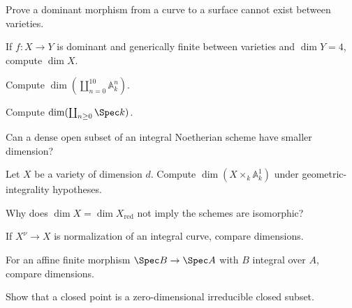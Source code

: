 \begin{exercise}[VI.30.E12]\label{exer:vi30-12}
Prove a dominant morphism from a curve to a surface cannot exist between varieties.
\end{exercise}

\begin{exercise}[VI.30.E13]\label{exer:vi30-13}
If $f:X\to Y$ is dominant and generically finite between varieties and $\dim Y=4$, compute $\dim X$.
\end{exercise}

\begin{exercise}[VI.30.E14]\label{exer:vi30-14}
Compute $\dim(\coprod_{n=0}^{10}\mathbb A^n_k)$.
\end{exercise}

\begin{exercise}[VI.30.E15]\label{exer:vi30-15}
Compute $\dim(\coprod_{n\ge0}\Spec k)$.
\end{exercise}

\begin{exercise}[VI.30.E16]\label{exer:vi30-16}
Can a dense open subset of an integral Noetherian scheme have smaller dimension?
\end{exercise}

\begin{exercise}[VI.30.E17]\label{exer:vi30-17}
Let $X$ be a variety of dimension $d$. Compute $\dim(X\times_k\mathbb A^1_k)$ under geometric-integrality hypotheses.
\end{exercise}

\begin{exercise}[VI.30.E18]\label{exer:vi30-18}
Why does $\dim X=\dim X_{\mathrm{red}}$ not imply the schemes are isomorphic?
\end{exercise}

\begin{exercise}[VI.30.E19]\label{exer:vi30-19}
If $X^\nu\to X$ is normalization of an integral curve, compare dimensions.
\end{exercise}

\begin{exercise}[VI.30.E20]\label{exer:vi30-20}
For an affine finite morphism $\Spec B\to\Spec A$ with $B$ integral over $A$, compare dimensions.
\end{exercise}

\begin{exercise}[VI.30.E21]\label{exer:vi30-21}
Show that a closed point is a zero-dimensional irreducible closed subset.
\end{exercise}

